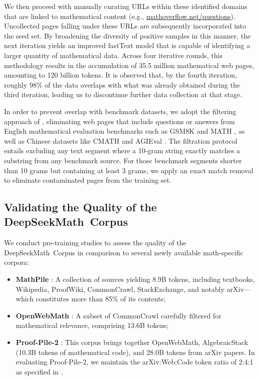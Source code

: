 We then proceed with manually curating URLs within these identified domains that are linked to mathematical content (e.g., \url{mathoverflow.net/questions}). Uncollected pages falling under these URLs are subsequently incorporated into the seed set. By broadening the diversity of positive samples in this manner, the next iteration yields an improved fastText model that is capable of identifying a larger quantity of mathematical data. Across four iterative rounds, this methodology results in the accumulation of 35.5 million mathematical web pages, amounting to 120 billion tokens. It is observed that, by the fourth iteration, roughly 98\% of the data overlaps with what was already obtained during the third iteration, leading us to discontinue further data collection at that stage.

In order to prevent overlap with benchmark datasets, we adopt the filtering approach of \cite{deepseek-coder}, eliminating web pages that include questions or answers from English mathematical evaluation benchmarks such as GSM8K \citep{gsm8k} and MATH \citep{MATH}, as well as Chinese datasets like CMATH \citep{wei2023cmath} and AGIEval \citep{agieval}. The filtration protocol entails excluding any text segment where a 10-gram string exactly matches a substring from any benchmark source. For those benchmark segments shorter than 10 grams but containing at least 3 grams, we apply an exact match removal to eliminate contaminated pages from the training set.

\subsection{Validating the Quality of the DeepSeekMath~Corpus}

We conduct pre-training studies to assess the quality of the DeepSeekMath~Corpus in comparison to several newly available math-specific corpora:

\begin{itemize}[topsep=0pt]
    \item \textbf{MathPile} \citep{mathpile}: A collection of sources yielding 8.9B tokens, including textbooks, Wikipedia, ProofWiki, CommonCrawl, StackExchange, and notably arXiv—which constitutes more than 85\% of its contents;
    \item \textbf{OpenWebMath} \citep{openwebmath}: A subset of CommonCrawl carefully filtered for mathematical relevance, comprising 13.6B tokens;
    \item \textbf{Proof-Pile-2} \citep{llemma}: This corpus brings together OpenWebMath, AlgebraicStack (10.3B tokens of mathematical code), and 28.0B tokens from arXiv papers. In evaluating Proof-Pile-2, we maintain the arXiv:Web:Code token ratio of 2:4:1 as specified in \cite{llemma}.
\end{itemize}

